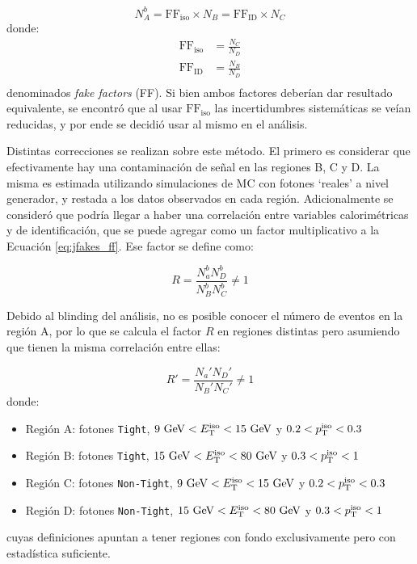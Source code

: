 \begin{equation}
  N_A^b = \text{FF}_{\text{iso}}\times N_B = \text{FF}_{\text{ID}}\times N_C
  \label{eq:jfakes_ff}
\end{equation}
%
donde:
\begin{equation}
  \begin{split}
    \text{FF}_{\text{iso}} &= \frac{N_C}{N_D} \\
    \text{FF}_{\text{ID}} &= \frac{N_B}{N_D} \\
  \end{split}
\end{equation}
%
denominados \textit{fake factors} (FF). 
Si bien ambos factores deberían dar resultado equivalente, se encontró que al usar $\text{FF}_{\text{iso}}$ las incertidumbres sistemáticas se veían reducidas, y por ende se decidió usar al mismo en el análisis.

Distintas correcciones se realizan sobre este método. El primero es considerar que efectivamente hay una contaminación de señal en las regiones B, C y D. La misma es estimada utilizando simulaciones de MC con fotones `reales' a nivel generador, y restada a los datos observados en cada región. Adicionalmente se consideró que podría llegar a haber una correlación entre variables calorimétricas y de identificación, que se puede agregar como un factor multiplicativo a la Ecuación \ref{eq:jfakes_ff}. Ese factor se define como:

\begin{equation}
  R = \frac{N_a^b N_D^b}{N_B^b N_C^b} \neq 1
\end{equation}

Debido al blinding del análisis, no es posible conocer el número de eventos en la región A, por lo que se calcula el factor $R$ en regiones distintas pero asumiendo que tienen la misma correlación entre ellas:

\begin{equation}
  R' = \frac{N_a' N_D'}{N_B' N_C'} \neq 1
\end{equation}
%
donde:
\begin{itemize}
  \item Región A: fotones \texttt{Tight}, $9\ \text{GeV}<E_{\text{T}}^{\text{iso}}<15\ \text{GeV}$ y $0.2<p_{\text{T}}^{\text{iso}}<0.3$
  \item Región B: fotones \texttt{Tight}, $15\ \text{GeV}<E_{\text{T}}^{\text{iso}}<80\ \text{GeV}$ y $0.3<p_{\text{T}}^{\text{iso}}<1$
  \item Región C: fotones \texttt{Non-Tight}, $9\ \text{GeV}<E_{\text{T}}^{\text{iso}}<15\ \text{GeV}$ y $0.2<p_{\text{T}}^{\text{iso}}<0.3$
  \item Región D: fotones \texttt{Non-Tight}, $15\ \text{GeV}<E_{\text{T}}^{\text{iso}}<80\ \text{GeV}$ y $0.3<p_{\text{T}}^{\text{iso}}<1$
\end{itemize}
%
cuyas definiciones apuntan a tener regiones con fondo exclusivamente pero con estadística suficiente.

